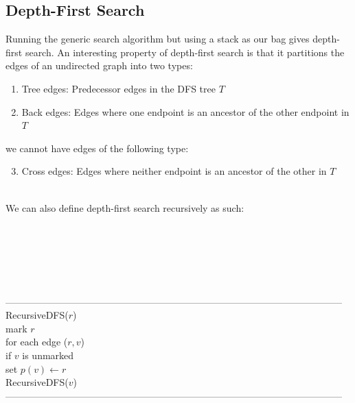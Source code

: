 \documentclass{article}
\begin{document}
\subsection{Depth-First Search}
Running the generic search algorithm but using a stack as our bag gives depth-first search. An interesting property of depth-first search is that it partitions the edges of an undirected graph into two types:
\begin{enumerate}
	\item Tree edges: Predecessor edges in the DFS tree $T$
	\item Back edges: Edges where one endpoint is an ancestor of the other endpoint in $T$
\end{enumerate}
we cannot have edges of the following type:
\begin{enumerate}
	\setcounter{enumi}{2}
	\item Cross edges: Edges where neither endpoint is an ancestor of the other in $T$
\end{enumerate}
\ \\
We can also define depth-first search recursively as such:\\\\\\\\\\\\\\
---------------------------------------------------------------------------------------------------------
RecursiveDFS($r$)\\
	\hspace*{7mm} mark $r$\\
	\hspace*{7mm} for each edge ($r, v$)\\
	\hspace*{14mm} if $v$ is unmarked\\
	\hspace*{21mm} set $p(v) \leftarrow r$\\
	\hspace*{21mm} RecursiveDFS($v$)\\
---------------------------------------------------------------------------------------------------------\\
\end{document}
